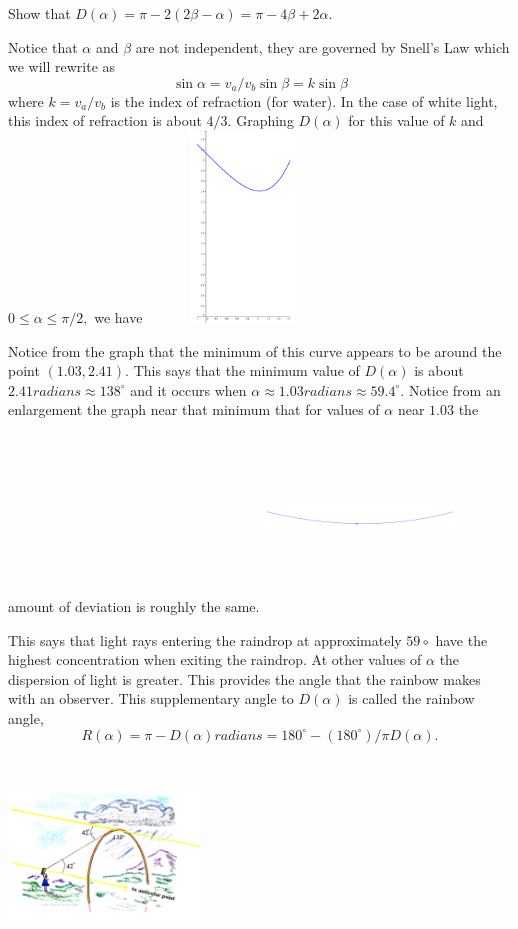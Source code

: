 \begin{myproblem}{}
  Show that $D(\alpha)=\pi-2(2\beta-\alpha)=\pi-4\beta+2\alpha.$

Notice that $\alpha$ and $\beta$ are not independent, they are governed by Snell's Law which we will rewrite as 
$$
\sin\alpha=v_a/v_b\sin\beta=k \sin\beta
$$
where $k=v_a/v_b$  is the index of refraction (for water).  In the case of white light, this index of refraction is about $4/3.$  Graphing $D(\alpha)$ for this value of $k$ and $0\le\alpha\le \pi/2,$ we have
\includegraphics*[height=2in,width=2in]{Figures/Rainbow2}

Notice from the graph that the minimum of this curve appears to be
around the point $(1.03,2.41).$  This says that the minimum value of
$D(\alpha)$ is about $2.41 radians\approx 138^\circ $ and it occurs when $\alpha\approx 1.03
radians\approx 59.4^\circ.$  Notice from an enlargement the graph near that minimum
that for values of $\alpha$ near $1.03$ the amount of deviation is roughly the
same.
\includegraphics*[height=2in,width=2in]{Figures/Rainbow3}

This says that light rays entering the raindrop at approximately
$59\circ$ have the highest concentration when exiting the raindrop.
At other values of $\alpha$ the dispersion of light is greater.  This
provides the angle that the rainbow makes with an observer.  This
supplementary angle to $D(\alpha)$ is called the rainbow angle,
$$
R(\alpha)=\pi-D(\alpha)  radians=180^\circ-(180^\circ)/\pi D(\alpha).
$$

\includegraphics*[height=2in,width=2in]{Figures/Rainbow4}
\end{myproblem}

